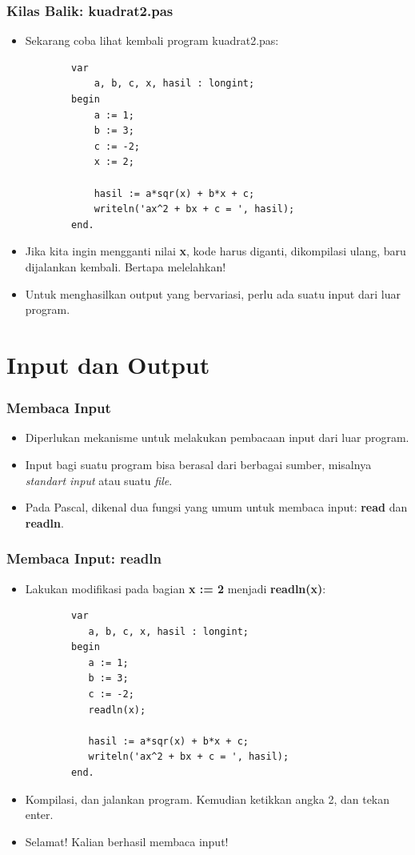 \documentclass{beamer}
\begin{document}
\begin{frame}[fragile]
\frametitle{Kilas Balik: kuadrat2.pas}
\begin{itemize}
	\item Sekarang coba lihat kembali program kuadrat2.pas:
	\begin{lstlisting}
		var
		    a, b, c, x, hasil : longint;
		begin
		    a := 1;
		    b := 3;
		    c := -2;
		    x := 2;	    

		    hasil := a*sqr(x) + b*x + c;
		    writeln('ax^2 + bx + c = ', hasil);
		end.
	\end{lstlisting}
	\item Jika kita ingin mengganti nilai \textbf{x}, kode harus diganti, dikompilasi ulang, baru dijalankan kembali. Bertapa melelahkan!
	\item Untuk menghasilkan output yang bervariasi, perlu ada \newline suatu input dari luar program.
\end{itemize}
\end{frame}

\section{Input dan Output}
\frame{\sectionpage}

\begin{frame}
\frametitle{Membaca Input}
\begin{itemize}	
	\item Diperlukan mekanisme untuk melakukan pembacaan input dari luar program.
	\item Input bagi suatu program bisa berasal dari berbagai sumber, misalnya \textit{standart input} atau suatu \textit{file}.
	\item Pada Pascal, dikenal dua fungsi yang umum untuk membaca input: \alert{\textbf{read}} dan \alert{\textbf{readln}}.
\end{itemize}
\end{frame}

\begin{frame}[fragile]
\frametitle{Membaca Input: readln}
\begin{itemize}
	\item Lakukan modifikasi pada bagian \textbf{x := 2} menjadi \textbf{readln(x)}:
	\begin{lstlisting}
		var
		   a, b, c, x, hasil : longint;
		begin
		   a := 1;
		   b := 3;
		   c := -2;
		   readln(x);
		
		   hasil := a*sqr(x) + b*x + c;
		   writeln('ax^2 + bx + c = ', hasil);
		end.
	\end{lstlisting}
	\item Kompilasi, dan jalankan program. Kemudian ketikkan angka 2, dan tekan enter.
	\item Selamat! Kalian berhasil membaca input!
\end{itemize}
\end{frame}
\end{document}
